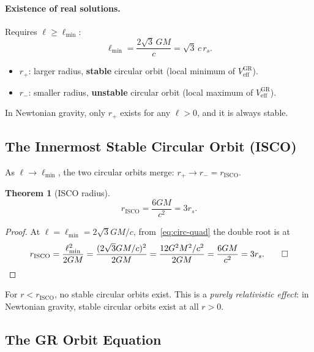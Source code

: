 \documentclass[12pt,a4paper]{article}
\theoremstyle{plain}
\newtheorem{theorem}{Theorem}[section]
\theoremstyle{definition}
\theoremstyle{remark}
\newcommand{\leff}{\ell}  %
\begin{document}
\paragraph{Existence of real solutions.} Requires $\leff\geq\leff_{\min}$:
\[
  \leff_{\min} = \frac{2\sqrt{3}\,GM}{c} = \sqrt{3}\,c\,r_s.
\]

\begin{itemize}
  \item $r_+$: larger radius, \textbf{stable} circular orbit (local minimum of $V_{\mathrm{eff}}^{\mathrm{GR}}$).
  \item $r_-$: smaller radius, \textbf{unstable} circular orbit (local maximum of $V_{\mathrm{eff}}^{\mathrm{GR}}$).
\end{itemize}

In Newtonian gravity, only $r_+$ exists for any $\leff>0$, and it is always stable.

\subsection{The Innermost Stable Circular Orbit (ISCO)}

As $\leff\to\leff_{\min}$, the two circular orbits merge: $r_+\to r_-=r_{\mathrm{ISCO}}$.

\begin{theorem}[ISCO radius]\label{thm:isco}
\[
  r_{\mathrm{ISCO}} = \frac{6GM}{c^2} = 3r_s.
\]
\end{theorem}
\begin{proof}
At $\leff=\leff_{\min}=2\sqrt{3}GM/c$, from~\eqref{eq:circ-quad} the double root is at
\[
  r_{\mathrm{ISCO}} = \frac{\leff_{\min}^2}{2GM}
  = \frac{(2\sqrt{3}GM/c)^2}{2GM}
  = \frac{12G^2M^2/c^2}{2GM}
  = \frac{6GM}{c^2} = 3r_s. \qed
\]
\end{proof}

For $r < r_{\mathrm{ISCO}}$, no stable circular orbits exist. This is a \textit{purely relativistic effect}: in Newtonian gravity, stable circular orbits exist at all $r>0$.

\subsection{The GR Orbit Equation}
\end{document}
